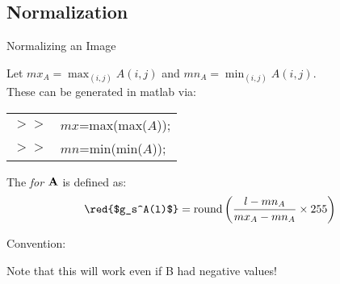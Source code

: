 \subsection{Normalization}
%
%
\begin{slide}{Normalizing an Image}
\begin{titlelist}{}{}

\item<2-> 
Let $mx_A= \max_{(i,j)} A(i,j)$ and $mn_A= \min_{(i,j)}
A(i,j)$.\\

These can be generated in matlab via:

\begin{tabular}{ll}
$>>$&$mx$=max(max($A$)); \\
$>>$&$mn$=min(min($A$));
\end{tabular}

\item<3-> 
The 
{\em for ${\bf A}$} is defined as:
\begin{eqnarray}
\mbox{\red{$g_s^A(l)$}}=\mbox{round}\left({l-mn_A \over mx_A-mn_A}\times
255 \right)
\end{eqnarray}

\item<4-> 
Convention: \\


\item<5-> 
Note that this will work even if B had negative values!

\end{titlelist}

\end{slide}


